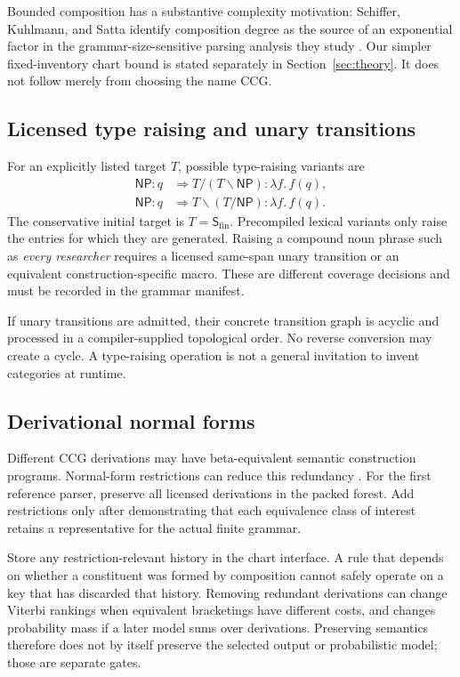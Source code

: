 \documentclass[11pt,a4paper]{article}
\newcommand{\NP}{\mathsf{NP}}
\newcommand{\SF}{\mathsf{S}_{\mathrm{fin}}}
\begin{document}
Bounded composition has a substantive complexity motivation: Schiffer,
Kuhlmann, and Satta identify composition degree as the source of an
exponential factor in the grammar-size-sensitive parsing analysis they study
\cite{boundedccg}. Our simpler fixed-inventory chart bound is stated
separately in Section~\ref{sec:theory}. It does not follow merely from choosing
the name CCG.

\subsection{Licensed type raising and unary transitions}
For an explicitly listed target \(T\), possible type-raising variants are
\begin{align}
  \NP:q&\Longrightarrow T/(T\backslash\NP):\lambda f.\,f(q),\\
  \NP:q&\Longrightarrow T\backslash(T/\NP):\lambda f.\,f(q).
\end{align}
The conservative initial target is \(T=\SF\). Precompiled lexical variants
only raise the entries for which they are generated. Raising a compound noun
phrase such as \emph{every researcher} requires a licensed same-span unary
transition or an equivalent construction-specific macro. These are different
coverage decisions and must be recorded in the grammar manifest.

If unary transitions are admitted, their concrete transition graph is acyclic
and processed in a compiler-supplied topological order. No reverse conversion
may create a cycle. A type-raising operation is not a general invitation to
invent categories at runtime.

\subsection{Derivational normal forms}
Different CCG derivations may have beta-equivalent semantic construction
programs. Normal-form restrictions can reduce this redundancy
\cite{eisner}. For the first reference parser, preserve all licensed
derivations in the packed forest. Add restrictions only after demonstrating
that each equivalence class of interest retains a representative for the
actual finite grammar.

Store any restriction-relevant history in the chart interface. A rule that
depends on whether a constituent was formed by composition cannot safely
operate on a key that has discarded that history. Removing redundant
derivations can change Viterbi rankings when equivalent bracketings have
different costs, and changes probability mass if a later model sums over
derivations. Preserving semantics therefore does not by itself preserve the
selected output or probabilistic model; those are separate gates.
\end{document}
